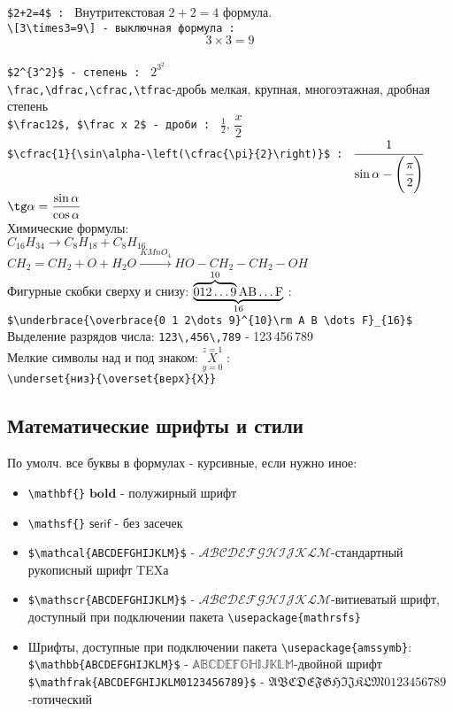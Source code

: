 \documentclass[a4paper,12pt]{article}%
\theoremstyle{plain}%
\theoremstyle{definition}%
\theoremstyle{remark}%
\begin{document}
\verb|$2+2=4$ : | Внутритекстовая $2+2=4$ формула. \\
\verb|\[3\times3=9\] - выключная формула : | \[3\times3=9\] \\
\verb|$2^{3^2}$ - степень : | $2^{3^2}$ \\
\verb|\frac,\dfrac,\cfrac,\tfrac|-дробь мелкая, крупная, многоэтажная, дробная степень \\
\verb|$\frac12$, $\frac x 2$ - дроби : | $\frac12$, $\dfrac x 2$ \\
\verb|$\cfrac{1}{\sin\alpha-\left(\cfrac{\pi}{2}\right)}$ : | $\cfrac{1}{\sin\alpha-\left(\cfrac{\pi}{2}\right)}$ \\
$\tg\alpha=\dfrac{\sin\alpha}{\cos\alpha}$ \\

\noindent Химические формулы: \\
$C_{16}H_{34} \to C_8H_{18}+C_8H_{16}$ \\
$CH_2=CH_2+O+H_2O \xrightarrow{KMnO_4} HO-CH_2-CH_2-OH$ \\
Фигурные скобки сверху и снизу: $\underbrace{\overbrace{0 1 2 \dots 9}^{10}\rm A B \dots F}_{16}$ : \\
\verb|$\underbrace{\overbrace{0 1 2\dots 9}^{10}\rm A B \dots F}_{16}$| \\
Выделение разрядов числа: \verb|123\,456\,789| - 123\,456\,789 \\
Мелкие символы над и под знаком: $\underset{y=0}{\overset{z=1}{X}}$ : \\
\verb|\underset{низ}{\overset{верх}{X}}|



\subsection{Математические шрифты и стили}

\noindent По умолч. все буквы в формулах - курсивные, если нужно иное: 
\begin{itemize}
\item \verb|\mathbf{}| $\mathbf{bold}$ - полужирный шрифт
\item \verb|\mathsf{}| $\mathsf{serif}$ - без засечек
\item \verb|$\mathcal{ABCDEFGHIJKLM}$| - $\mathcal{ABCDEFGHIJKLM}$-стандартный рукописный шрифт TEXа
\item \verb|$\mathscr{ABCDEFGHIJKLM}$| - $\mathscr{ABCDEFGHIJKLM}$-витиеватый шрифт, доступный при подключении пакета \verb|\usepackage{mathrsfs}|
\item Шрифты, доступные при подключении пакета \verb|\usepackage{amssymb}|: \\
\verb|$\mathbb{ABCDEFGHIJKLM}$| - $\mathbb{ABCDEFGHIJKLM}$-двойной шрифт \\
\verb|$\mathfrak{ABCDEFGHIJKLM0123456789}$| - $\mathfrak{ABCDEFGHIJKLM0123456789}$  -готический
\end{itemize}
\end{document}
